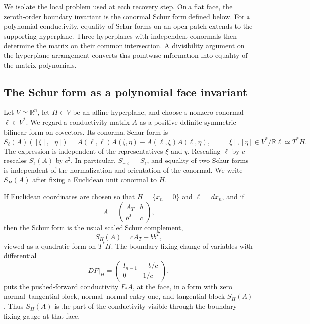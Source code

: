 \documentclass[10pt,a4paper]{amsart}
\newcommand{\R}{\mathbb R}
\begin{document}
We isolate the local problem used at each recovery step.  On a flat face, the
zeroth-order boundary invariant is the conormal Schur form defined below.  For
a polynomial conductivity, equality of Schur forms on an open patch extends to
the supporting hyperplane.  Three hyperplanes with independent conormals then
determine the matrix on their common intersection.  A divisibility argument on
the hyperplane arrangement converts this pointwise information into equality
of the matrix polynomials.

\subsection{The Schur form as a polynomial face invariant}

Let \(V\simeq\R^n\), let \(H\subset V\) be an affine hyperplane, and choose a
nonzero conormal \(\ell\in V^*\).  We regard a conductivity matrix \(A\) as a
positive definite symmetric bilinear form on covectors.  Its conormal Schur
form is
\begin{equation}
  S_{\ell}(A)([\xi],[\eta])
  =A(\ell,\ell)A(\xi,\eta)-A(\ell,\xi)A(\ell,\eta),
  \qquad [\xi],[\eta]\in V^*/\R\ell\simeq T^*H .
  \label{eq:conormal-schur-form}
\end{equation}
The expression is independent of the representatives \(\xi\) and \(\eta\).
Rescaling \(\ell\) by \(c\) rescales \(S_\ell(A)\) by \(c^2\).  In particular,
\(S_{-\ell}=S_\ell\), and equality of two Schur forms is independent of the
normalization and orientation of the conormal.  We write \(S_H(A)\) after
fixing a Euclidean unit conormal to \(H\).

If Euclidean coordinates are chosen so that \(H=\{x_n=0\}\) and
\(\ell=dx_n\), and if
\begin{equation}
  A=
  \begin{pmatrix}
    A_T & b\\ b^T & c
  \end{pmatrix},
  \label{eq:block-form}
\end{equation}
then the Schur form is the usual scaled Schur complement,
\begin{equation}
  S_H(A)=cA_T-bb^T,
  \label{eq:schur-form}
\end{equation}
viewed as a quadratic form on \(T^*H\).  The boundary-fixing change of variables
with differential
\begin{equation}
  DF|_H=
  \begin{pmatrix}
    I_{n-1} & -b/c\\ 0 & 1/c
  \end{pmatrix},
\end{equation}
puts the pushed-forward conductivity \(F_*A\), at the face, in a form with
zero normal--tangential block, normal--normal entry one, and tangential block
\(S_H(A)\).  Thus \(S_H(A)\) is the part of the conductivity visible through
the boundary-fixing gauge at that face.
\end{document}
